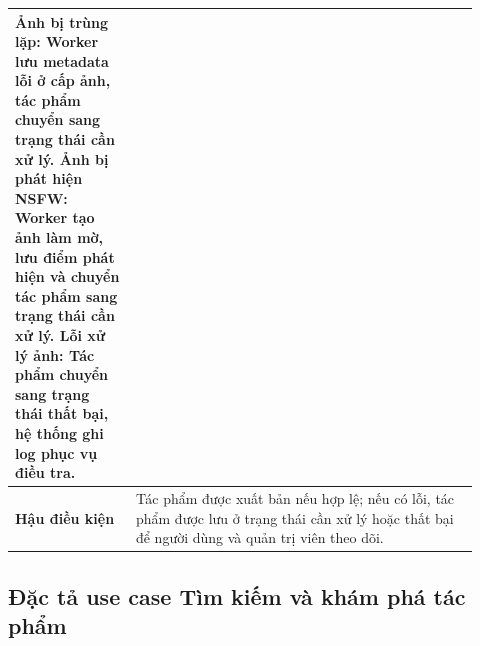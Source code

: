\begin{table}[h!]
\begin{tabular}{|p{0.24\linewidth}|p{0.68\linewidth}|}
\textbf{Ảnh bị trùng lặp:} Worker lưu metadata lỗi ở cấp ảnh, tác phẩm chuyển sang trạng thái cần xử lý. \newline
\textbf{Ảnh bị phát hiện NSFW:} Worker tạo ảnh làm mờ, lưu điểm phát hiện và chuyển tác phẩm sang trạng thái cần xử lý. \newline
\textbf{Lỗi xử lý ảnh:} Tác phẩm chuyển sang trạng thái thất bại, hệ thống ghi log phục vụ điều tra. \\
\hline
\textbf{Hậu điều kiện} & Tác phẩm được xuất bản nếu hợp lệ; nếu có lỗi, tác phẩm được lưu ở trạng thái cần xử lý hoặc thất bại để người dùng và quản trị viên theo dõi. \\
\hline
\end{tabular}
\end{table}
\FloatBarrier

\subsection{Đặc tả use case Tìm kiếm và khám phá tác phẩm}
\label{subsection:2.3.3}

